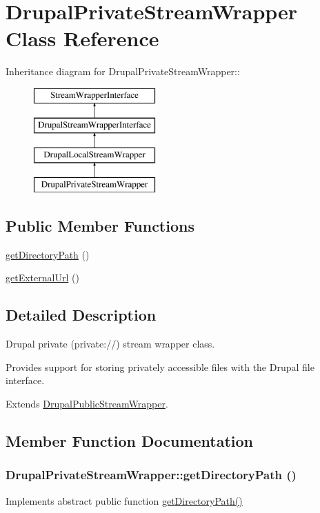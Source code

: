 \hypertarget{classDrupalPrivateStreamWrapper}{
\section{DrupalPrivateStreamWrapper Class Reference}
\label{classDrupalPrivateStreamWrapper}
}
Inheritance diagram for DrupalPrivateStreamWrapper::\begin{figure}[H]
\begin{center}
\leavevmode
\includegraphics[height=4cm]{classDrupalPrivateStreamWrapper}
\end{center}
\end{figure}
\subsection*{Public Member Functions}
\begin{DoxyCompactItemize}
\item 
\hyperlink{classDrupalPrivateStreamWrapper_a4440673a974028b3091bfbed80270bd8}{getDirectoryPath} ()
\item 
\hyperlink{classDrupalPrivateStreamWrapper_a1c1ee83f635dd12b6e806f1d1b1d1de3}{getExternalUrl} ()
\end{DoxyCompactItemize}


\subsection{Detailed Description}
Drupal private (private://) stream wrapper class.

Provides support for storing privately accessible files with the Drupal file interface.

Extends \hyperlink{classDrupalPublicStreamWrapper}{DrupalPublicStreamWrapper}. 

\subsection{Member Function Documentation}
\hypertarget{classDrupalPrivateStreamWrapper_a4440673a974028b3091bfbed80270bd8}{
\subsubsection[{getDirectoryPath}]{\setlength{\rightskip}{0pt plus 5cm}DrupalPrivateStreamWrapper::getDirectoryPath ()}}
\label{classDrupalPrivateStreamWrapper_a4440673a974028b3091bfbed80270bd8}
Implements abstract public function \hyperlink{classDrupalPrivateStreamWrapper_a4440673a974028b3091bfbed80270bd8}{getDirectoryPath()} 

